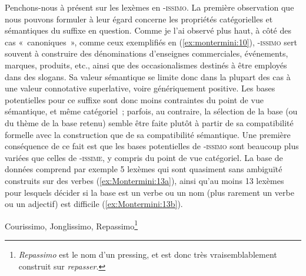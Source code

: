 \documentclass[output=paper]{langsci/langscibook}
\begin{document}
Penchons-nous à présent sur les lexèmes en -\textsc{issimo}. La première
observation que nous pouvons formuler à leur égard concerne les
propriétés catégorielles et sémantiques du suffixe en question. Comme je
l'ai observé plus haut, à côté des cas «~canoniques~», comme ceux
exemplifiés en (\ref{ex:montermini:10}), -\textsc{issimo} sert souvent à construire des
dénominations d'enseignes commerciales, événements, marques, produits,
etc., ainsi que des occasionalismes destinés à être employés dans des
slogans. Sa valeur sémantique se limite donc dans la plupart des cas à
une valeur connotative superlative, voire génériquement positive. Les
bases potentielles pour ce suffixe sont donc moins contraintes du point
de vue sémantique, et même catégoriel~; parfois, au contraire, la
sélection de la base (ou du thème de la base retenu) semble être faite
plutôt à partir de sa compatibilité formelle avec la construction que de
sa compatibilité sémantique. Une première conséquence de ce fait est que
les bases potentielles de \textsc{‑issimo} sont beaucoup plus variées
que celles de -\textsc{issime}, y compris du point de vue catégoriel. La
base de données comprend par exemple 5 lexèmes qui sont quasiment sans
ambiguïté construits sur des verbes (\ref{ex:Montermini:13a}), ainsi qu'au moins 13 lexèmes
pour lesquels décider si la base est un verbe ou un nom (plus rarement
un verbe ou un adjectif) est difficile (\ref{ex:Montermini:13b}).


\ea \label{ex:Montermini:13}

        \ea \label{ex:Montermini:13a} {Courissimo}, {Jonglissimo},
{Repassimo}\footnote{\emph{Repassimo} est le nom d'un pressing, et
  est donc très vraisemblablement construit sur \emph{repasser}.}
\end{document}
